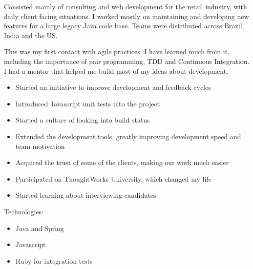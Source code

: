 \documentclass[10pt,a4paper,ragged2e,withhyper]{altacv}
\begin{document}
\begin{paracol}{2}
\divider


{\RaggedRight
Consisted mainly of consulting and web development for the retail industry, with daily client facing situations. I worked mostly on maintaining and developing new features for a large legacy Java code base. Teams were distributed across Brazil, India and the US.

This was my first contact with agile practices. I have learned much from it, including the importance of pair programming, TDD and Continuous Integration. I had a mentor that helped me build most of my ideas about development.

\begin{itemize}
\item Started an initiative to improve development and feedback cycles
\item Introduced Javascript unit tests into the project
\item Started a culture of looking into build status
\item Extended the development tools, greatly improving development speed and team motivation
\item Acquired the trust of some of the clients, making our work much easier
\item Participated on ThoughtWorks University, which changed my life
\item Started learning about interviewing candidates
\end{itemize}

Technologies:
\begin{itemize}
\item Java and Spring
\item Javascript
\item Ruby for integration tests
\end{itemize}
}





\end{paracol}
\end{document}
